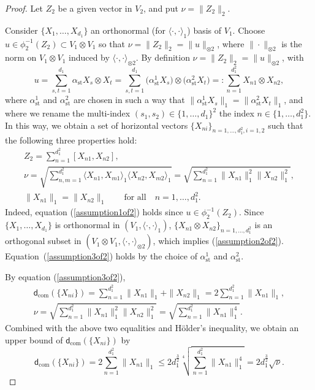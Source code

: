 \documentclass[pdftex]{sigma}
\numberwithin{equation}{section}
\begin{document}
\begin{proof}
Let $Z_2$ be a given vector in $V_2$,
and put $\nu=\|Z_2\|_2$.

 Consider $\{X_1,\dots,X_{d_1}\}$ an orthonormal (for $\langle\cdot,\cdot\rangle_1$) basis of $V_1$.
 Choose $u\in \phi_2^{-1}(Z_2)\subset V_1\otimes V_1$ so that $\nu=\|Z_2\|_2=\|u\|_{\otimes 2}$,
 where $\|\cdot\|_{\otimes 2}$ is the norm on $V_1\otimes V_1$ induced by $\langle\cdot,\cdot\rangle_{\otimes 2}$.
 By definition $\nu=\|Z_2\|_2=\|u\|_{\otimes 2}$,
 with
 \[
 u=\sum_{s,t=1}^{d_1}\alpha_{\mathrm{st}}X_s\otimes X_t=\sum_{s,t=1}^{d_1}\big(\alpha_{\mathrm{st}}^1X_s\big)\otimes\big(\alpha_{\mathrm{st}}^2 X_t\big)=:\sum_{n=1}^{d_1^2}X_{n1}\otimes X_{n2},
 \]
 where $\alpha_{\mathrm{st}}^1$ and $\alpha_{\mathrm{st}}^2$ are chosen in such a way that $\big\|\alpha_{\mathrm{st}}^1X_s\big\|_1=\big\|\alpha_{\mathrm{st}}^2X_t\big\|_1$,
 and where we rename the multi-index $(s_1,s_2)\in\{1,\dots,d_1\}^2$ the index $n\in\big\{1,\dots,d_1^2\big\}$.
 In this way, we obtain a set of horizontal vectors $\{X_{ni}\}_{n=1,\dots,d_1^2,i=1,2}$ such that the following three properties hold:
\begin{gather}
 Z_2=\sum_{n=1}^{d_1^2}[X_{n1},X_{n2}],\label{assumption1of2}
 \\
 \nu=\sqrt{\sum_{n,m=1}^{d_1^2}\langle X_{n1},X_{m1}\rangle_1\langle X_{n2},X_{m2}\rangle_1}=\sqrt{\sum_{n=1}^{d_1^2}\|X_{n1}\|_1^2\|X_{n2}\|_1^2},
 \label{assumption2of2}
 \\
\|X_{n1}\|_1=\|X_{n2}\|_1\qquad\text{for all} \quad n=1,\dots,d_1^2.\label{assumption3of2}
\end{gather}
Indeed,
equation (\ref{assumption1of2}) holds since $u\!\in\! \phi_2^{-1}(Z_2)$.
Since $\{X_1,\dots,X_{d_1}\}$ is orthonormal in $(V_1,\langle\cdot,\cdot\rangle_1)$,
$\{X_{n1}\otimes X_{n2}\}_{n=1,\dots,d_1^2}$ is an orthogonal subset in $(V_1\otimes V_1,\langle\cdot,\cdot\rangle_{\otimes 2})$,
which implies (\ref{assumption2of2}).
Equa\-tion~(\ref{assumption3of2}) holds by the choice of $\alpha_{\mathrm{st}}^1$ and $\alpha_{\mathrm{st}}^2$.

By equation (\ref{assumption3of2}),
\begin{gather*}
\mathsf{d}_{\mathrm{com}}(\{X_{ni}\})=\sum_{n=1}^{d_1^2}\|X_{n1}\|_1+\|X_{n2}\|_1 =2\sum_{n=1}^{d_1^2}\|X_{n1}\|_1,
\\
\nu=\sqrt{\sum_{n=1}^{d_1^2}\|X_{n1}\|_1^2\|X_{n2}\|_1^2}=\sqrt{\sum_{n=1}^{d_1^2}\|X_{n1}\|_1^4}.
\end{gather*}
Combined with the above two equalities and H\"older's inequality,
we obtain an upper bound of $\mathsf{d}_{\mathrm{com}}(\{X_{ni}\})$ by
\begin{equation}\label{eq2step2}
 \mathsf{d}_{\mathrm{com}}(\{X_{ni}\})= 2\sum_{n=1}^{d_1^2}\|X_{n1}\|_1\leq 2d_1^{\frac{3}{2}}\sqrt[4]{\sum_{n=1}^{d_1^2}\|X_{n1}\|_1^4}=2d_1^{\frac{3}{2}}\sqrt{\nu}.
\end{equation}


\end{proof}
\end{document}
